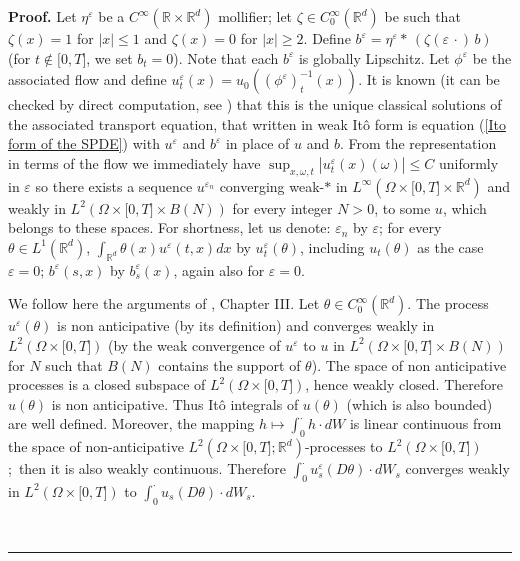 \documentclass[a4paper,11pt]{article}
\newenvironment{proof}[1][Proof]{\textbf{#1.} }{\ \rule{0.5em}{0.5em}}
\begin{document}
\begin{proof}
Let $\eta ^{\varepsilon }$ be a $C^{\infty }(\mathbb{R}\times \mathbb{R}^{d})
$ mollifier; let $\zeta \in C_{0}^{\infty }(\mathbb{R}^{d})$ be such that $%
\zeta (x)=1$ for $|x|\leq 1$ and $\zeta (x)=0$ for $|x|\geq 2$. Define $%
b^{\varepsilon }=\eta ^{\varepsilon }\ast \,(\zeta (\varepsilon \,\cdot )\,b)
$ (for $t\not\in \lbrack 0,T]$, we set $b_{t}=0$). Note that each $%
b^{\varepsilon }$ is globally Lipschitz. Let $\phi ^{\varepsilon }$ be the
associated flow and define $u_{t}^{\varepsilon }(x)=u_{0}((\phi
^{\varepsilon })_{t}^{-1}(x))$. It is known (it can be checked by direct
computation, see \cite{K1}) that this is the unique classical solutions of
the associated transport equation, that written in weak It\^{o} form is
equation (\ref{Ito form of the SPDE}) with $u^{\varepsilon }$ and $%
b^{\varepsilon }$ in place of $u$ and $b$. From the representation in terms
of the flow we immediately have $\sup_{x,\omega ,t}|u_{t}^{\varepsilon
}(x)(\omega )|\leq C$ uniformly in $\varepsilon $ so there exists a sequence
$u^{\varepsilon _{n}}$ converging weak-$*$ in $L^{\infty }(\Omega \times
\lbrack 0,T]\times \mathbb{R}^{d})$ and weakly in $L^{2}(\Omega \times
\lbrack 0,T]\times B\left( N\right) )$ for every integer $N>0$, to some $u$,
which belongs to these spaces. For shortness, let us denote: $\varepsilon
_{n}$ by $\varepsilon $; for every $\theta \in L^{1}(\mathbb{R}^{d})$, $%
\int_{\mathbb{R}^{d}}\theta (x)u^{\varepsilon }(t,x)dx$ by $%
u_{t}^{\varepsilon }(\theta )$, including $u_{t}(\theta )$ as the case $%
\varepsilon =0$; $b^{\varepsilon }(s,x)$ by $b_{s}^{\varepsilon }(x)$, again
also for $\varepsilon =0$.

We follow here the arguments of \cite{Pard}, Chapter III. Let $\theta \in
C_{0}^{\infty }(\mathbb{R}^{d})$. The process $u^{\varepsilon }(\theta )$ is
non anticipative (by its definition) and converges weakly in $L^{2}(\Omega
\times \lbrack 0,T])$ (by the weak convergence of $u^{\varepsilon }$ to $u$
in $L^{2}(\Omega \times \lbrack 0,T]\times B\left( N\right) )$ for $N$ such
that $B\left( N\right) $ contains the support of $\theta $). The space of
non anticipative processes is a closed subspace of $L^{2}(\Omega \times
\lbrack 0,T])$, hence weakly closed. Therefore $u(\theta )$ is non
anticipative. Thus It\^{o} integrals of $u(\theta )$ (which is also bounded)
are well defined. Moreover, the mapping $h\mapsto \int_{0}^{\cdot }h\cdot dW$
is linear continuous from the space of non-anticipative $L^{2}(\Omega \times
\lbrack 0,T];\mathbb{R}^{d})$-processes to $L^{2}(\Omega \times \lbrack 0,T])
$;\ then it is also weakly continuous. Therefore $\int_{0}^{\cdot
}u_{s}^{\varepsilon }\left( D\theta \right) \cdot dW_{s}$ converges weakly
in $L^{2}(\Omega \times \lbrack 0,T])$ to $\int_{0}^{\cdot }u_{s}\left(
D\theta \right) \cdot dW_{s}$.


\end{proof}
\end{document}
